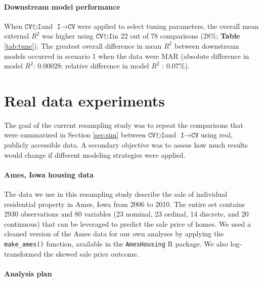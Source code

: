 \documentclass[AMA,STIX1COL,doublespace]{WileyNJD-v2}
\begin{document}
\paragraph{Downstream model performance}

When $\texttt{CV}\!\circlearrowright\!\texttt{I}$\space and
$\texttt{I}\!\!\rightarrow\!\texttt{CV}$\space were applied to select
tuning parameters, the overall mean external \(R^2\) was higher using
$\texttt{CV}\!\circlearrowright\!\texttt{I}$\space in 22 out of 78
comparisons (28\%; \textbf{Table} \ref{tab:tune}). The greatest overall
difference in mean \(R^2\) between downstream models occurred in
scenario 1 when the data were MAR (absolute difference in model \(R^2\):
0.00028; relative difference in model \(R^2\) : 0.07\%).

\section{Real data experiments} \label{sec:app}

The goal of the current resampling study was to repeat the comparisons
that were summarized in Section \ref{sec:sim} between
$\texttt{CV}\!\circlearrowright\!\texttt{I}$\space and
$\texttt{I}\!\!\rightarrow\!\texttt{CV}$\space using real, publicly
accessible data. A secondary objective was to assess how much results
would change if different modeling strategies were applied.

\paragraph{Ames, Iowa housing data}

The data we use in this resampling study describe the sale of individual
residential property in Ames, Iowa from 2006 to 2010. The entire set
contains 2930 observations and 80 variables (23 nominal, 23 ordinal, 14
discrete, and 20 continuous) that can be leveraged to predict the sale
price of homes.\cite{de2011ames} We used a cleaned version of the Ames
data for our own analyses by applying the \texttt{make\_ames()}
function, available in the \texttt{AmesHousing} R
package.\cite{AmesHousing} We also log-transformed the skewed sale price
outcome.

\paragraph{Analysis plan}
\end{document}
